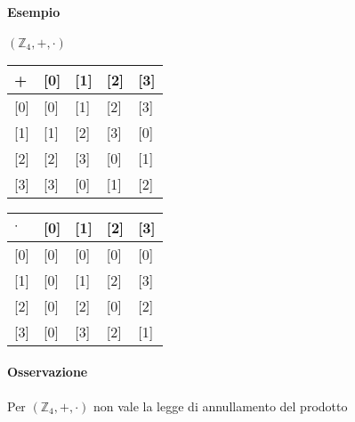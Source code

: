 \documentclass[a4paper]{report}
\begin{document}
\paragraph{Esempio} $(\mathbb{Z}_4,+,\cdot)$
\begin{table}[h]
    \centering
    \begin{tabular}{|l|l|l|l|l|}
        \hline
        +       & {[}0{]} & {[}1{]} & {[}2{]} & {[}3{]} \\ \hline
        {[}0{]} & {[}0{]} & {[}1{]} & {[}2{]} & {[}3{]} \\ \hline
        {[}1{]} & {[}1{]} & {[}2{]} & {[}3{]} & {[}0{]} \\ \hline
        {[}2{]} & {[}2{]} & {[}3{]} & {[}0{]} & {[}1{]} \\ \hline
        {[}3{]} & {[}3{]} & {[}0{]} & {[}1{]} & {[}2{]} \\ \hline
    \end{tabular}
\end{table}
\begin{table}[h]
    \centering
    \begin{tabular}{|l|l|l|l|l|}
        \hline
        $\cdot$ & {[}0{]} & {[}1{]} & {[}2{]} & {[}3{]} \\ \hline
        {[}0{]} & {[}0{]} & {[}0{]} & {[}0{]} & {[}0{]} \\ \hline
        {[}1{]} & {[}0{]} & {[}1{]} & {[}2{]} & {[}3{]} \\ \hline
        {[}2{]} & {[}0{]} & {[}2{]} & {[}0{]} & {[}2{]} \\ \hline
        {[}3{]} & {[}0{]} & {[}3{]} & {[}2{]} & {[}1{]} \\ \hline
    \end{tabular}
\end{table}
\paragraph{Osservazione} Per $(\mathbb{Z}_4,+,\cdot)$ non vale la legge di annullamento del prodotto
\end{document}
